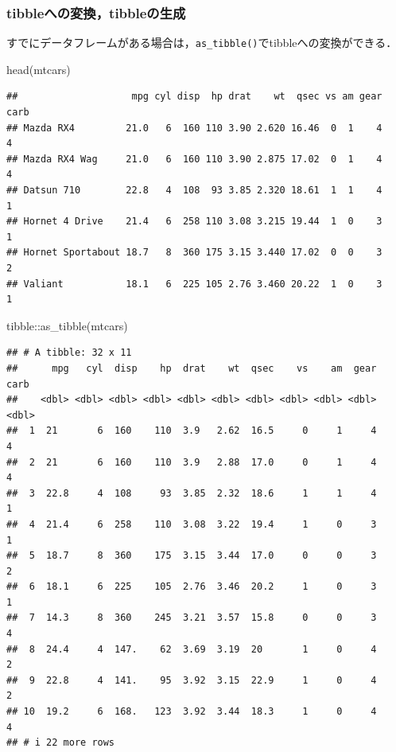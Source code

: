 \documentclass[
]{article}
\newenvironment{Shaded}{\begin{snugshade}}{\end{snugshade}}
\newcommand{\FunctionTok}[1]{\textcolor[rgb]{0.00,0.00,0.00}{#1}}
\newcommand{\NormalTok}[1]{#1}
\newcommand{\SpecialCharTok}[1]{\textcolor[rgb]{0.00,0.00,0.00}{#1}}
\begin{document}
\hypertarget{tibbleux3078ux306eux5909ux63dbtibbleux306eux751fux6210}{%
\subsubsection{tibbleへの変換，tibbleの生成}\label{tibbleux3078ux306eux5909ux63dbtibbleux306eux751fux6210}}

すでにデータフレームがある場合は，\texttt{as\_tibble()}でtibbleへの変換ができる．

\begin{Shaded}
\begin{Highlighting}[]
\FunctionTok{head}\NormalTok{(mtcars)}
\end{Highlighting}
\end{Shaded}

\begin{verbatim}
##                    mpg cyl disp  hp drat    wt  qsec vs am gear carb
## Mazda RX4         21.0   6  160 110 3.90 2.620 16.46  0  1    4    4
## Mazda RX4 Wag     21.0   6  160 110 3.90 2.875 17.02  0  1    4    4
## Datsun 710        22.8   4  108  93 3.85 2.320 18.61  1  1    4    1
## Hornet 4 Drive    21.4   6  258 110 3.08 3.215 19.44  1  0    3    1
## Hornet Sportabout 18.7   8  360 175 3.15 3.440 17.02  0  0    3    2
## Valiant           18.1   6  225 105 2.76 3.460 20.22  1  0    3    1
\end{verbatim}

\begin{Shaded}
\begin{Highlighting}[]
\NormalTok{tibble}\SpecialCharTok{::}\FunctionTok{as\_tibble}\NormalTok{(mtcars)}
\end{Highlighting}
\end{Shaded}

\begin{verbatim}
## # A tibble: 32 x 11
##      mpg   cyl  disp    hp  drat    wt  qsec    vs    am  gear  carb
##    <dbl> <dbl> <dbl> <dbl> <dbl> <dbl> <dbl> <dbl> <dbl> <dbl> <dbl>
##  1  21       6  160    110  3.9   2.62  16.5     0     1     4     4
##  2  21       6  160    110  3.9   2.88  17.0     0     1     4     4
##  3  22.8     4  108     93  3.85  2.32  18.6     1     1     4     1
##  4  21.4     6  258    110  3.08  3.22  19.4     1     0     3     1
##  5  18.7     8  360    175  3.15  3.44  17.0     0     0     3     2
##  6  18.1     6  225    105  2.76  3.46  20.2     1     0     3     1
##  7  14.3     8  360    245  3.21  3.57  15.8     0     0     3     4
##  8  24.4     4  147.    62  3.69  3.19  20       1     0     4     2
##  9  22.8     4  141.    95  3.92  3.15  22.9     1     0     4     2
## 10  19.2     6  168.   123  3.92  3.44  18.3     1     0     4     4
## # i 22 more rows
\end{verbatim}
\end{document}
